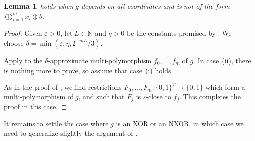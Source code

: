 \documentclass{article}
\newtheorem{lemma}[theorem]{Lemma}
\theoremstyle{definition}
\theoremstyle{remark}
\newcommand\eps{\varepsilon}
\renewcommand\epsilon{\eps}
\begin{document}
\begin{lemma} \label{lem:approximate-multi-polymorphisms-not-xor}
 holds when $g$ depends on all coordinates and is not of the form $\bigoplus_{i=1}^m x_i \oplus b$.
\end{lemma}
\begin{proof}
Given $\epsilon > 0$, let $L \in \mathbb{N}$ and $\eta > 0$ be the constants promised by . We choose $\delta = \min(\epsilon, \eta, 2^{-mL}/3)$.

Apply  to the $\delta$-approximate multi-polymorphism $f_0,\ldots,f_m$ of $g$. In case~(ii), there is nothing more to prove, so assume that case~(i) holds.

As in the proof of , we find restrictions $F_0,\ldots,F_m\colon \{0,1\}^T \to \{0,1\}$ which form a multi-polymorphism of $g$, and such that $F_j$ is $\epsilon$-close to $f_j$. This completes the proof in this case.
\end{proof}

It remains to settle the case where $g$ is an XOR or an NXOR, in which case we need to generalize slightly the argument of .
\end{document}
